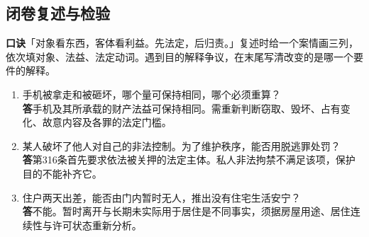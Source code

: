 \subsection*{闭卷复述与检验}
\textbf{口诀}\quad「对象看东西，客体看利益。先法定，后归责。」复述时给一个案情画三列，依次填对象、法益、法定动词。遇到目的解释争议，在末尾写清改变的是哪一个要件的解释。

\begin{enumerate}
\item 手机被拿走和被砸坏，哪个量可保持相同，哪个必须重算？\\
\textbf{答}\quad 手机及其所承载的财产法益可保持相同。需重新判断窃取、毁坏、占有变化、故意内容及各罪的法定门槛。
\item 某人破坏了他人对自己的非法控制。为了维护秩序，能否用脱逃罪处罚？\\
\textbf{答}\quad 第316条首先要求依法被关押的法定主体。私人非法拘禁不满足该项，保护目的不能补齐它。
\item 住户两天出差，能否由门内暂时无人，推出没有住宅生活安宁？\\
\textbf{答}\quad 不能。暂时离开与长期未实际用于居住是不同事实，须据房屋用途、居住连续性与许可状态重新分析。
\end{enumerate}
